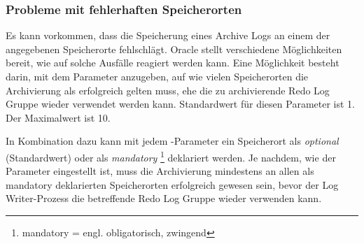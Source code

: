        \subsubsection{Probleme mit fehlerhaften Speicherorten}
          Es kann vorkommen, dass die Speicherung eines Archive Logs an einem der angegebenen Speicherorte fehlschlägt. Oracle stellt verschiedene Möglichkeiten bereit, wie auf solche Ausfälle reagiert werden kann. Eine Möglichkeit besteht darin, mit dem Parameter  anzugeben, auf wie vielen Speicherorten die Archivierung als erfolgreich gelten muss, ehe die zu archivierende Redo Log Gruppe wieder verwendet werden kann. Standardwert für diesen Parameter ist 1. Der Maximalwert ist 10.

          In Kombination dazu kann mit jedem -Parameter ein Speicherort als \textit{optional} (Standardwert) oder als \textit{mandatory} \footnote{mandatory = engl. obligatorisch, zwingend} deklariert werden. Je nachdem, wie der Parameter  eingestellt ist, muss die Archivierung mindestens an allen als mandatory deklarierten Speicherorten erfolgreich gewesen sein, bevor der Log Writer-Prozess die betreffende Redo Log Gruppe wieder verwenden kann.

